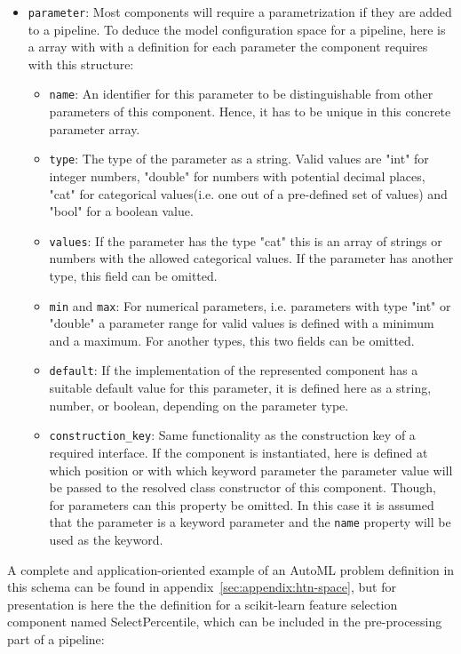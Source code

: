 \begin{itemize}
\begin{itemize}[label=\textbullet]
            \item \texttt{parameter}: Most components will require a parametrization if they are added to a pipeline. To deduce the model configuration space for a pipeline, here is a array with with a definition for each parameter the component requires with this structure:
            \begin{itemize}[label=\textbullet]
                \item \texttt{name}: An identifier for this parameter to be distinguishable from other parameters of this component. Hence, it has to be unique in this concrete parameter array.
                \item \texttt{type}: The type of the parameter as a string. Valid values are "int" for integer numbers, "double" for numbers with potential decimal places, "cat" for categorical values(i.e. one out of a pre-defined set of values) and "bool" for a boolean value.
                \item \texttt{values}: If the parameter has the type "cat" this is an array of strings or numbers with the allowed categorical values. If the parameter has another type, this field can be omitted.
                \item \texttt{min} and \texttt{max}: For numerical parameters, i.e. parameters with type "int" or "double" a parameter range for valid values is defined with a minimum and a maximum. For another types, this two fields can be omitted.
                \item \texttt{default}: If the implementation of the represented component has a suitable default value for this parameter, it is defined here as a string, number, or boolean, depending on the parameter type.
                \item \texttt{construction\_key}: Same functionality as the construction key of a required interface.
                    If the component is instantiated, here is defined at which position or with which keyword parameter the parameter value will be passed to the resolved class constructor of this component.
                    Though, for parameters can this property be omitted.
                    In this case it is assumed that the parameter is a keyword parameter and the \texttt{name} property will be used as the keyword.
            \end{itemize}
        \end{itemize}
\end{itemize}
A complete and application-oriented example of an AutoML problem definition in this schema can be found in appendix~\ref{sec:appendix:htn-space}, but for presentation is here the the definition for a scikit-learn feature selection component named SelectPercentile, which can be included in the pre-processing part of a pipeline:
